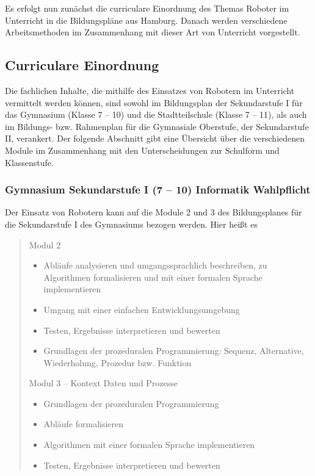 \documentclass[paper=a4, DIV=14, BCOR=15mm, twoside=on, onecolumn=on, open = right, titlepage =on, parskip =half, headsepline = on, footsepline = on, chapterprefix = on, appendixprefix = off, fontsize = 12pt, numbers = noenddot, abstract = on]{scrbook}
\begin{document}
Es erfolgt nun zunächst die curriculare Einordnung des Themas Roboter im Unterricht in die Bildungspläne aus Hamburg. Danach werden verschiedene Arbeitsmethoden im Zusammenhang mit dieser Art von Unterricht vorgestellt.

\subsection{Curriculare Einordnung}
Die fachlichen Inhalte, die mithilfe des Einsatzes von Robotern im Unterricht vermittelt werden können, sind sowohl im Bildungsplan der Sekundarstufe I für das Gymnasium (Klasse 7 -- 10) und die Stadtteilschule (Klasse 7 -- 11), als auch im Bildungs- bzw. Rahmenplan für die Gymnasiale Oberstufe, der Sekundarstufe II, verankert. Der folgende Abschnitt gibt eine Übersicht über die verschiedenen Module im Zusammenhang mit den Unterscheidungen zur Schulform und Klassenstufe. 

\subsubsection{Gymnasium Sekundarstufe I (7 -- 10) Informatik Wahlpflicht}
Der Einsatz von Robotern kann auf die Module 2 und 3 des Bildungsplanes für die Sekundarstufe I des Gymnasiums bezogen werden. Hier heißt es\\

 \begin{quote}
Modul 2
\begin{itemize}
\item Abläufe analysieren und umgangssprachlich beschreiben, zu Algorithmen formalisieren und mit einer formalen Sprache implementieren
\item Umgang mit einer einfachen Entwicklungsumgebung
\item Testen, Ergebnisse interpretieren und bewerten
\item Grundlagen der prozeduralen Programmierung: Sequenz, Alternative, Wiederholung, Prozedur bzw. Funktion
\end{itemize}
\vspace*{1cm}
Modul 3 -- Kontext Daten und Prozesse
\begin{itemize}
\item Grundlagen der prozeduralen Programmierung
\item Abläufe formalisieren
\item Algorithmen mit einer formalen Sprache implementieren
\item Testen, Ergebnisse interpretieren und bewerten \qquad \cite{gymsek1:11} 
\end{itemize}
 \end{quote}
\end{document}
